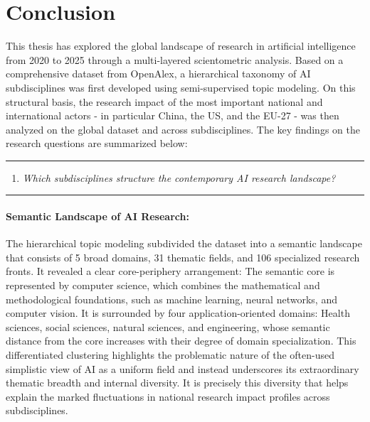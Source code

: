 \documentclass{article}
\begin{document}
	\section{Conclusion}
	
	This thesis has explored the global landscape of research in artificial intelligence from 2020 to 2025 through a multi-layered scientometric analysis. Based on a comprehensive dataset from OpenAlex, a hierarchical taxonomy of AI subdisciplines was first developed using semi-supervised topic modeling. On this structural basis, the research impact of the most important national and international actors - in particular China, the US, and the EU-27 - was then analyzed on the global dataset and across subdisciplines. The key findings on the research questions are summarized below:
	
	\vspace{1em}
	\rule{\linewidth}{0.4pt}
	
	\begin{enumerate}
		\item[\textbf{RQ1}]\hspace*{2em}\parbox[t]{\dimexpr\linewidth-2em}{
			\textit{Which subdisciplines structure the contemporary AI research landscape?}
		}
	\end{enumerate}
	
	\vspace{0.25em}
	\rule{\linewidth}{0.4pt}
	\vspace{1em}
	
	\paragraph{Semantic Landscape of AI Research:} The hierarchical topic modeling subdivided the dataset into a semantic landscape that consists of 5 broad domains, 31 thematic fields, and 106 specialized research fronts. It revealed a clear core-periphery arrangement: The semantic core is represented by computer science, which combines the mathematical and methodological foundations, such as machine learning, neural networks, and computer vision. It is surrounded by four application-oriented domains: Health sciences, social sciences, natural sciences, and engineering, whose semantic distance from the core increases with their degree of domain specialization. This differentiated clustering highlights the problematic nature of the often-used simplistic view of AI as a uniform field and instead underscores its extraordinary thematic breadth and internal diversity. It is precisely this diversity that helps explain the marked fluctuations in national research impact profiles across subdisciplines.
	
\end{document}
